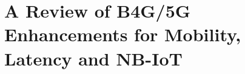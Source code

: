 \chapter{A Review of B4G/5G Enhancements for Mobility, Latency and NB-IoT}

\begin{center}
{\large\uppercase{}} 

\vskip -6pt



\bigskip
{\large\uppercase{}} 

\vskip -6pt

\end{center}

\vskip 2cm




\vfill




\newpage

